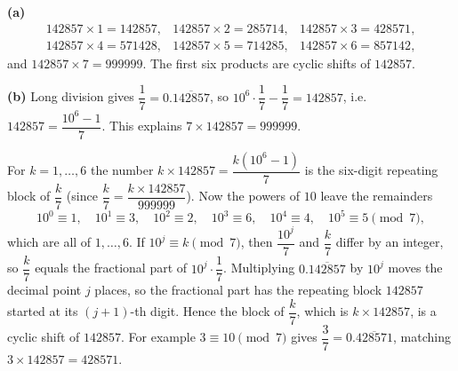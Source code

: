 \textbf{(a)}
\[
\begin{array}{lll}
142857\times1=142857, & 142857\times2=285714, & 142857\times3=428571,\\
142857\times4=571428, & 142857\times5=714285, & 142857\times6=857142,
\end{array}
\]
and $142857\times7=\boxed{999999}$. The first six products are cyclic shifts of $142857$.

\textbf{(b)} Long division gives $\dfrac{1}{7}=0.\overline{142857}$, so $10^6\cdot\dfrac{1}{7}-\dfrac{1}{7}=142857$, i.e. $142857=\dfrac{10^6-1}{7}$. This explains $7\times142857=999999$.

For $k=1,\dots,6$ the number $k\times142857=\dfrac{k(10^6-1)}{7}$ is the six-digit repeating block of $\dfrac {k}{7}$ (since $\dfrac {k}{7}=\dfrac{k\times142857}{999999}$). Now the powers of $10$ leave the remainders
\[
10^0\equiv1,\quad10^1\equiv3,\quad10^2\equiv2,\quad10^3\equiv6,\quad10^4\equiv4,\quad10^5\equiv5\pmod7,
\]
which are all of $1,\dots,6$. If $10^j\equiv k\pmod7$, then $\dfrac{10^j}{7}$ and $\dfrac {k}{7}$ differ by an integer, so $\dfrac {k}{7}$ equals the fractional part of $10^j\cdot\dfrac{1}{7}$. Multiplying $0.\overline{142857}$ by $10^j$ moves the decimal point $j$ places, so the fractional part has the repeating block $142857$ started at its $(j+1)$-th digit. Hence the block of $\dfrac {k}{7}$, which is $k\times142857$, is a cyclic shift of $142857$. For example $3\equiv10\pmod7$ gives $\dfrac{3}{7}=0.\overline{428571}$, matching $3\times142857=428571$.
